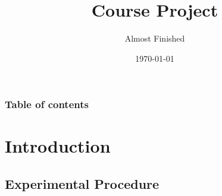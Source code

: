\documentclass{beamer}
\begin{document}
\title{Course Project}  
\author{Almost Finished}
\date{\today} 

\begin{frame}
\titlepage
\end{frame}

\begin{frame}
\frametitle{Table of contents}
\tableofcontents
\end{frame}


\section{Introduction} 
\subsection{Experimental Procedure}
\end{document}
